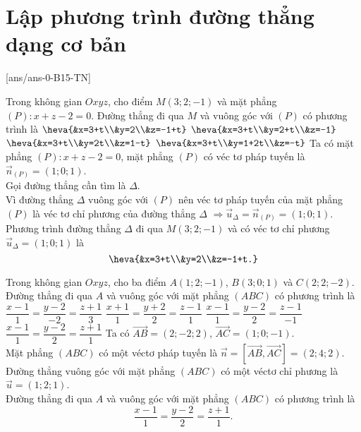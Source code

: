 \section{Lập phương trình đường thẳng dạng cơ bản}
\TN
{}[ans/ans-0-B15-TN]
\setcounter{ex}{9}
\begin{ex}%
	Trong không gian $Oxyz$, cho điểm $M(3;2 ;-1)$ và mặt phẳng $(P)\colon x+z-2=0$. Đường thẳng đi qua $M$ và vuông góc với $(P)$ có phương trình là
	\choice
	{\True $\heva{&x=3+t\\&y=2\\&z=-1+t}$}
	{$\heva{&x=3+t\\&y=2+t\\&z=-1}$}
	{$\heva{&x=3+t\\&y=2t\\&z=1-t}$}
	{$\heva{&x=3+t\\&y=1+2t\\&z=-t}$}
	\loigiai
	{
	Ta có mặt phẳng $(P)\colon x+z-2=0$, mặt phẳng $(P)$ có véc tơ pháp tuyến là $\overrightarrow{n}_{(P)}=(1;0;1)$.\\
		Gọi đường thẳng cần tìm là $\Delta$.\\
		Vì đường thẳng $\Delta$ vuông góc với $(P)$ nên véc tơ pháp tuyến của mặt phẳng $(P)$ là véc tơ chỉ phương của đường thẳng $\Delta$ $\Rightarrow \overrightarrow{u}_{\Delta}=\overrightarrow{n}_{(P)}=(1;0;1)$.\\
		Phương trình đường thẳng $\Delta$ đi qua $M(3;2;-1)$ và có véc tơ chỉ phương $\overrightarrow{u}_{\Delta}=(1;0;1)$ là
		\[\heva{&x=3+t\\&y=2\\&z=-1+t.}\]
	}
\end{ex}
\begin{ex}%
	Trong không gian $Oxyz$, cho ba điểm $A(1;2;-1)$, $B(3;0;1)$ và $C(2;2;-2)$. Đường thẳng đi qua $A$ và vuông góc với mặt phẳng $(ABC)$ có phương trình là
	\choice
	{$\dfrac{x-1}{1}=\dfrac{y-2}{-2}=\dfrac{z+1}{3}$}
	{$\dfrac{x+1}{1}=\dfrac{y+2}{2}=\dfrac{z-1}{1}$}
	{$\dfrac{x-1}{1}=\dfrac{y-2}{2}=\dfrac{z-1}{-1}$}
	{\True $\dfrac{x-1}{1}=\dfrac{y-2}{2}=\dfrac{z+1}{1}$}
	\loigiai
	{Ta có $\overrightarrow{AB}=(2;-2;2)$, $\overrightarrow{AC}=(1;0;-1)$.\\
		Mặt phẳng $(ABC)$ có một véctơ pháp tuyến là $\vec{n}=\left[\overrightarrow{AB},\overrightarrow{AC}\right]=(2;4;2)$.\\
		Đường thẳng vuông góc với mặt phẳng $(ABC)$ có một véctơ chỉ phương là $\vec{u}=(1;2;1)$.\\
		Đường thẳng đi qua $A$ và vuông góc với mặt phẳng $(ABC)$ có phương trình là
		\[\dfrac{x-1}{1}=\dfrac{y-2}{2}=\dfrac{z+1}{1}.\]
	}
\end{ex}
